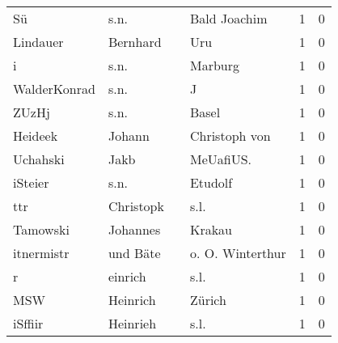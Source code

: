 \documentclass[10pt,a4paper,landscape]{article}
\begin{document}
\begin{longtable}{llllrr}
                       Sü &                               s.n. &             &                                Bald Joachim &          1 &         0 \\
                 Lindauer &                           Bernhard &             &                                         Uru &          1 &         0 \\
                        i &                               s.n. &             &                                     Marburg &          1 &         0 \\
             WalderKonrad &                               s.n. &             &                                           J &          1 &         0 \\
                    ZUzHj &                               s.n. &             &                                       Basel &          1 &         0 \\
                  Heideek &                             Johann &             &                               Christoph von &          1 &         0 \\
                 Uchahski &                               Jakb &             &                                  MeUafiUS.  &          1 &         0 \\
                  iSteier &                               s.n. &             &                                     Etudolf &          1 &         0 \\
                      ttr &                          Christopk &             &                                        s.l. &          1 &         0 \\
                 Tamowski &                           Johannes &             &                                      Krakau &          1 &         0 \\
               itnermistr &                           und Bäte &             &                            o. O. Winterthur &          1 &         0 \\
                        r &                            einrich &             &                                        s.l. &          1 &         0 \\
                      MSW &                           Heinrich &             &                                      Zürich &          1 &         0 \\
                  iSffiir &                           Heinrieh &             &                                        s.l. &          1 &         0 \\

\end{longtable}
\end{document}
